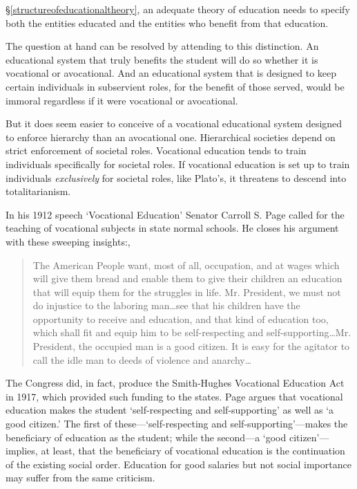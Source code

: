  \S\ref{structureofeducationaltheory}, an adequate theory of education needs to specify both the entities educated and the entities who benefit from that education.

The question at hand can be resolved by attending to this distinction. An educational system that truly benefits the student will do so whether it is vocational or avocational. And an educational system that is designed to keep certain individuals in subservient roles, for the benefit of those served, would be immoral regardless if it were vocational or avocational. 

But it does seem easier to conceive of a vocational educational system designed to enforce hierarchy than an avocational one. Hierarchical societies depend on strict enforcement of societal roles. Vocational education tends to train individuals specifically for societal roles. If vocational education is set up to train individuals \emph{exclusively} for societal roles, like Plato's, it threatens to descend into totalitarianism. 

In his 1912 speech `Vocational Education' Senator Carroll S. Page called for the teaching of vocational subjects in state normal schools. He closes his argument with these sweeping insights:, 

\begin{quote}

The American People want, most of all, occupation, and at wages which will give them bread and enable them to give their children an education that will equip them for the struggles in life. Mr. President, we must not do injustice to the laboring man{\ldots}see that his children have the opportunity to receive and education, and that kind of education too, which shall fit and equip him to be self-respecting and self-supporting{\ldots}Mr. President, the occupied man is a good citizen. It is easy for the agitator to call the idle man to deeds of violence and anarchy{\ldots} ~\citep[P. 66]{Page:1912we}
\end{quote}

The Congress did, in fact, produce the Smith-Hughes Vocational Education Act in 1917, which provided such funding to the states. Page argues that vocational education makes the student `self-respecting and self-supporting' as well as `a good citizen.' The first of these---`self-respecting and self-supporting'---makes the beneficiary of education as the student; while the second---a `good citizen'---implies, at least, that the beneficiary of vocational education is the continuation of the existing social order. Education for good salaries but not social importance may suffer from the same criticism.

